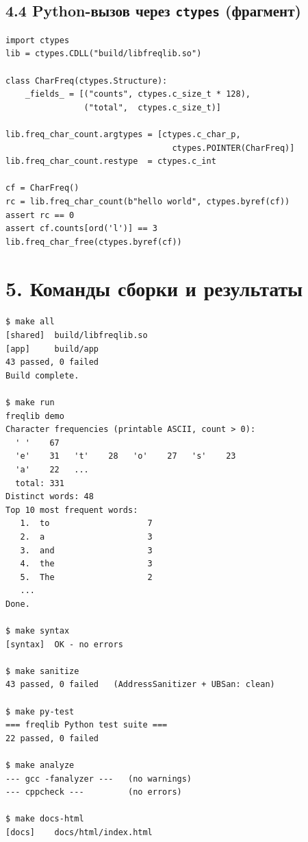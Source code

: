 \subsection*{4.4 Python-вызов через \texttt{ctypes} (фрагмент)}

\begin{lstlisting}[style=Pystyle]
import ctypes
lib = ctypes.CDLL("build/libfreqlib.so")

class CharFreq(ctypes.Structure):
    _fields_ = [("counts", ctypes.c_size_t * 128),
                ("total",  ctypes.c_size_t)]

lib.freq_char_count.argtypes = [ctypes.c_char_p,
                                  ctypes.POINTER(CharFreq)]
lib.freq_char_count.restype  = ctypes.c_int

cf = CharFreq()
rc = lib.freq_char_count(b"hello world", ctypes.byref(cf))
assert rc == 0
assert cf.counts[ord('l')] == 3
lib.freq_char_free(ctypes.byref(cf))
\end{lstlisting}

\HRule

\section*{5. Команды сборки и результаты}

\begin{lstlisting}[style=Bashstyle]
$ make all
[shared]  build/libfreqlib.so
[app]     build/app
43 passed, 0 failed
Build complete.

$ make run
freqlib demo
Character frequencies (printable ASCII, count > 0):
  ' '    67
  'e'    31   't'    28   'o'    27   's'    23
  'a'    22   ...
  total: 331
Distinct words: 48
Top 10 most frequent words:
   1.  to                    7
   2.  a                     3
   3.  and                   3
   4.  the                   3
   5.  The                   2
   ...
Done.

$ make syntax
[syntax]  OK - no errors

$ make sanitize
43 passed, 0 failed   (AddressSanitizer + UBSan: clean)

$ make py-test
=== freqlib Python test suite ===
22 passed, 0 failed

$ make analyze
--- gcc -fanalyzer ---   (no warnings)
--- cppcheck ---         (no errors)

$ make docs-html
[docs]    docs/html/index.html
\end{lstlisting}

\HRule

